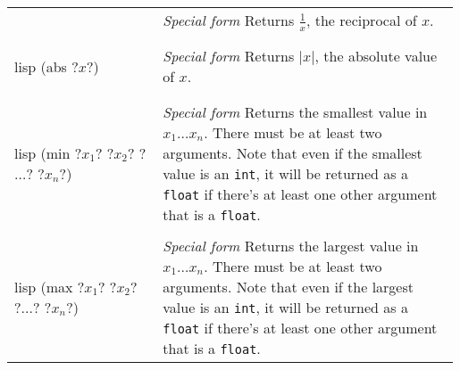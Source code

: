 \documentclass[a4paper, 12pt]{article}
\makeatletter
\newenvironment{funcdefs}
    {\begin{longtable}{@{} x{0.33\linewidth} @{} >{\raggedright\arraybackslash}p{0.66\linewidth} @{}}}
    {\end{longtable}}
\def\specialf/{\textit{Special form}\hspace{0.5em}}
\makeatother
\begin{document}
\begin{funcdefs}
    & \specialf/ Returns $\frac{1}{x}$, the reciprocal of $x$.
    \\ \\
    \begin{minipage}[t]{\linewidth}
        \centering
        \begin{cminted}[autogobble=true, escapeinside=??]{lisp}
            (abs ?$x$?)
        \end{cminted}
    \end{minipage}
    & \specialf/ Returns $|x|$, the absolute value of $x$.
    \\ \\
    \begin{minipage}[t]{\linewidth}
        \centering
        \begin{cminted}[autogobble=true, escapeinside=??]{lisp}
            (min ?$x_1$? ?$x_2$? ?$\ldots$? ?$x_n$?)
        \end{cminted}
    \end{minipage}
    & \specialf/ Returns the smallest value in $x_1 \ldots x_n$. There must be at least two arguments. Note that even if the smallest value is an \texttt{int}, it will be returned as a \texttt{float} if there's at least one other argument that is a \texttt{float}.
    \\ \\
    \begin{minipage}[t]{\linewidth}
        \centering
        \begin{cminted}[autogobble=true, escapeinside=??]{lisp}
            (max ?$x_1$? ?$x_2$? ?$\ldots$? ?$x_n$?)
        \end{cminted}
    \end{minipage}
    & \specialf/ Returns the largest value in $x_1 \ldots x_n$. There must be at least two arguments. Note that even if the largest value is an \texttt{int}, it will be returned as a \texttt{float} if there's at least one other argument that is a \texttt{float}.
\end{funcdefs}
\end{document}

